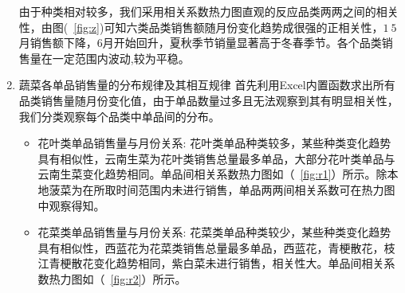 \documentclass[withoutpreface,bwprint]{cumcmthesis}
\begin{document}
\begin{enumerate}
由于种类相对较多，我们采用相关系数热力图直观的反应品类两两之间的相关性，由图(~\ref{fig:z})可知六类品类销售额随月份变化趋势成很强的正相关性，$1~5$月销售额下降，6月开始回升，夏秋季节销量显著高于冬春季节。各个品类销售量在一定范围内波动,较为平稳。
    \item 蔬菜各单品销售量的分布规律及其相互规律
首先利用Excel内置函数求出所有品类销售量随月份变化值，由于单品数量过多且无法观察到其有明显相关性，我们分类观察每个品类中单品间的分布。
	\begin{itemize}
    \item 花叶类单品销售量与月份关系: 花叶类单品种类较多，某些种类变化趋势具有相似性，云南生菜为花叶类销售总量最多单品，大部分花叶类单品与云南生菜变化趋势相同。单品间相关系数热力图如（~\ref{fig:r1}）所示。除本地菠菜为在所取时间范围内未进行销售，单品两两间相关系数可在热力图中观察得知。
    \item 花菜类单品销售量与月份关系: 花菜类单品种类较少，某些种类变化趋势具有相似性，西蓝花为花菜类销售总量最多单品，西蓝花，青梗散花，枝江青梗散花变化趋势相同，紫白菜未进行销售，相关性大。单品间相关系数热力图如（~\ref{fig:r2}）所示。
	\end{itemize}

\end{enumerate}
\end{document}
